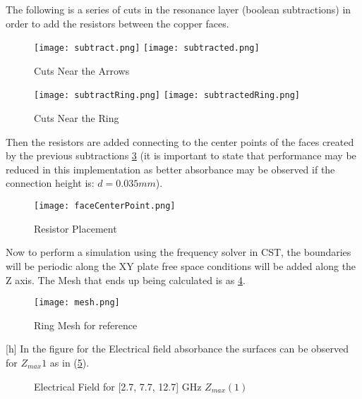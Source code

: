         The following is a series of cuts in the resonance layer (boolean subtractions)
        in order to add the resistors between the copper faces.
        \begin{figure}[h]
            \centering
            \texttt{[image: subtract.png]}\hfil
            \texttt{[image: subtracted.png]}
            \caption{Cuts Near the Arrows}
            \label{img:arrowCuts}
        \end{figure}

        \begin{figure}[h]
            \centering
            \texttt{[image: subtractRing.png]}\hfil
            \texttt{[image: subtractedRing.png]}
            \caption{Cuts Near the Ring}
            \label{img:ringCuts}
        \end{figure}

        Then the resistors are added connecting to the center points of the faces
        created by the previous subtractions \ref{img:resistors} (it is important to state that performance
        may be reduced in this implementation as better absorbance may be observed
        if the connection height is: $d=0.035mm$).
        \begin{figure}[h]
            \centering
            \texttt{[image: faceCenterPoint.png]}
            \caption{Resistor Placement}
            \label{img:resistors}
        \end{figure}

        Now to perform a simulation using the frequency solver in CST, the boundaries will be periodic
        along the XY plate free space conditions will be added along the Z axis.
        The Mesh that ends up being calculated is as \ref{img:RingAndArrowMesh}.
        \begin{figure}[h]
            \centering
            \texttt{[image: mesh.png]}
            \caption{Ring Mesh for reference}
            \label{img:RingAndArrowMesh}
        \end{figure}[h]
        In the figure for the Electrical field absorbance the surfaces can be observed for $Z_{max}1$
        as in (\ref{img:E_Zmax1}).
        \begin{figure}[h]
            \centering
             \hfil
             \hfil

            \caption{Electrical Field for [2.7, 7.7, 12.7] GHz $Z_{max}(1)$}
            \label{img:E_Zmax1}
        \end{figure}

